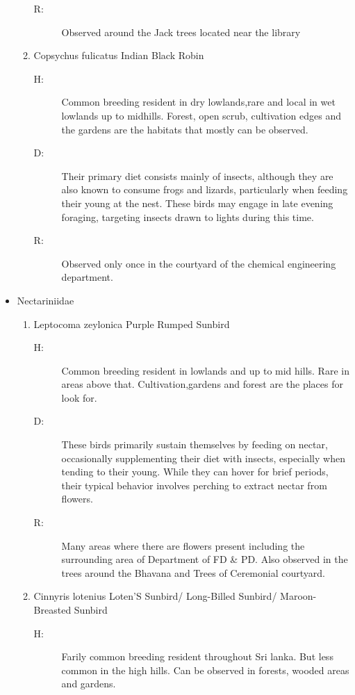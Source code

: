 \begin{itemize}
\begin{enumerate}
\begin{description}
\item[R: ]%
Observed around the Jack trees located near the library%
\end{description}%
\item%
Copsychus fulicatus\newline%
Indian Black Robin%
\begin{description}%
\item[H: ]%
Common breeding resident in dry lowlands,rare and local in wet lowlands up to midhills. Forest, open scrub, cultivation edges and the gardens are the habitats that mostly can be observed.%
\item[D: ]%
Their primary diet consists mainly of insects, although they are also known to consume frogs and lizards, particularly when feeding their young at the nest. These birds may engage in late evening foraging, targeting insects drawn to lights during this time.%
\item[R: ]%
Observed only once in the courtyard of the chemical engineering department.%
\end{description}%
\end{enumerate}%
\item%
Nectariniidae%
\begin{enumerate}%
\item%
Leptocoma zeylonica\newline%
Purple Rumped Sunbird%
\begin{description}%
\item[H: ]%
Common breeding resident in lowlands and up to mid hills. Rare in areas above that. Cultivation,gardens and forest are the places for look for. %
\item[D: ]%
These birds primarily sustain themselves by feeding on nectar, occasionally supplementing their diet with insects, especially when tending to their young. While they can hover for brief periods, their typical behavior involves perching to extract nectar from flowers.%
\item[R: ]%
Many areas where there are flowers present including the surrounding area of Department of FD \& PD. Also observed in the trees around the Bhavana and Trees of Ceremonial courtyard.%
\end{description}%
\item%
Cinnyris lotenius\newline%
Loten'S Sunbird/ Long{-}Billed Sunbird/ Maroon{-}Breasted Sunbird%
\begin{description}%
\item[H: ]%
Farily common breeding resident throughout Sri lanka. But less common in the high hills. Can be observed in forests, wooded areas and gardens.%

\end{description}
\end{enumerate}
\end{itemize}
